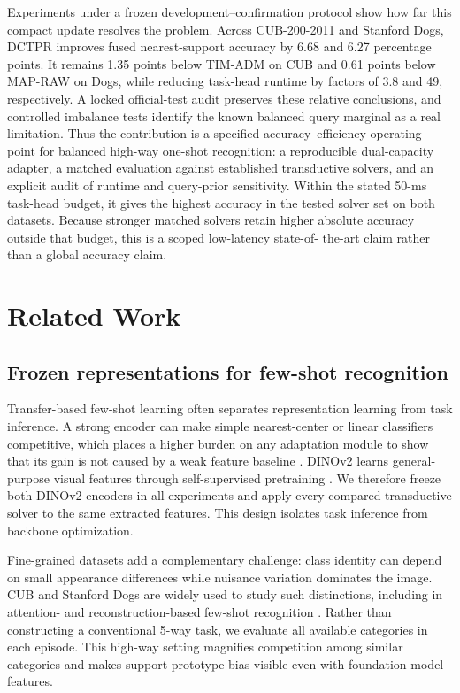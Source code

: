 \documentclass[]{spie}
\newcommand{\method}{\textsc{DCTPR}\xspace}
\begin{document}
Experiments under a frozen development--confirmation protocol show how far this
compact update resolves the problem. Across CUB-200-2011 and Stanford Dogs,
\method improves fused nearest-support accuracy by 6.68 and 6.27 percentage
points. It remains 1.35 points below TIM-ADM on CUB and 0.61 points below
MAP-RAW on Dogs, while reducing task-head runtime by factors of 3.8 and 49,
respectively. A locked official-test audit preserves these relative conclusions,
and controlled imbalance tests identify the known balanced query marginal as a
real limitation. Thus the contribution is a specified accuracy--efficiency
operating point for balanced high-way one-shot recognition: a reproducible
dual-capacity adapter, a matched evaluation against established transductive
solvers, and an explicit audit of runtime and query-prior sensitivity. Within
the stated 50-ms task-head budget, it gives the highest accuracy in the tested
solver set on both datasets. Because stronger matched solvers retain higher
absolute accuracy outside that budget, this is a scoped low-latency state-of-
the-art claim rather than a global accuracy claim.

\section{Related Work}
\label{sec:related}

\subsection{Frozen representations for few-shot recognition}

Transfer-based few-shot learning often separates representation learning from
task inference. A strong encoder can make simple nearest-center or linear
classifiers competitive, which places a higher burden on any adaptation module
to show that its gain is not caused by a weak feature baseline
\cite{closerlook,goodembedding,simpleshot}. DINOv2 learns
general-purpose visual features through self-supervised pretraining
\cite{dinov2}. We therefore freeze both DINOv2 encoders in all experiments and
apply every compared transductive solver to the same extracted features. This
design isolates task inference from backbone optimization.

Fine-grained datasets add a complementary challenge: class identity can depend
on small appearance differences while nuisance variation dominates the image.
CUB \cite{cubdataset} and Stanford Dogs \cite{stanforddogs} are widely used to
study such distinctions, including in attention- and reconstruction-based
few-shot recognition \cite{mamlfgvc,dualattention,bfrn}. Rather than
constructing a conventional 5-way task,
we evaluate all available categories in each episode. This high-way setting
magnifies competition among similar categories and makes support-prototype bias
visible even with foundation-model features.
\end{document}
